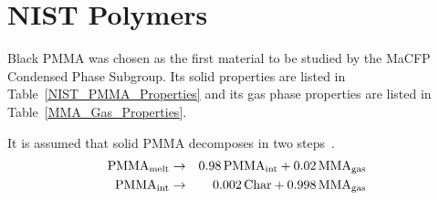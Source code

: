\clearpage

\section{NIST Polymers}
\label{NIST_Polymers_Properties}

Black PMMA was chosen as the first material to be studied by the MaCFP Condensed Phase Subgroup. Its solid properties are listed in Table~\ref{NIST_PMMA_Properties} and its gas phase properties are listed in Table~\ref{MMA_Gas_Properties}. 

It is assumed that solid PMMA decomposes in two steps~\cite{Fiola:FSJ2021}.
\begin{eqnarray}
   \hbox{PMMA}_{\rm melt}   &\to& 0.98 \, \hbox{PMMA}_{\rm int} + 0.02 \, \hbox{MMA}_{\rm gas}  \label{PMMA1of2} \\
   \hbox{PMMA}_{\rm int}    &\to& 0.002 \, \hbox{Char} +         0.998 \, \hbox{MMA}_{\rm gas}   \label{PMMA2of2}
\end{eqnarray}

